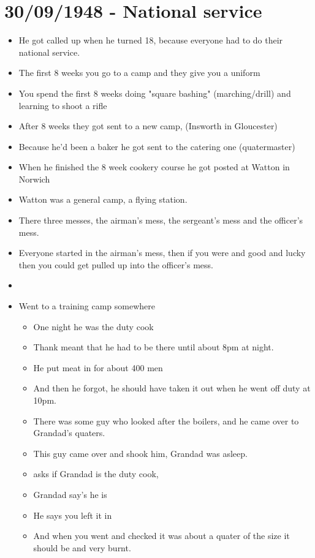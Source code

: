 \documentclass[10pt,twocolumn,letterpaper]{article}
\begin{document}
\section{30/09/1948 - National service}
\begin{itemize}
    \item He got called up when he turned 18, because everyone had to do their national service.
    \item The first 8 weeks you go to a camp and they give you a uniform
    \item You spend the first 8 weeks doing "square bashing" (marching/drill) and learning to shoot a rifle
    \item After 8 weeks they got sent to a new camp, (Insworth in Gloucester)
    \item Because he'd been a baker he got sent to the catering one (quatermaster)
    \item When he finished the 8 week cookery course he got posted at Watton in Norwich
    \item Watton was a general camp, a flying station.
    \item There three messes, the airman's mess, the sergeant's mess and the officer's mess.
    \item Everyone started in the airman's mess, then if you were and good and lucky then you could get pulled up into the officer's mess.
    \item 
    \item Went to a training camp somewhere 
    \begin{itemize}
        \item One night he was the duty cook
        \item Thank meant that he had to be there until about 8pm at night. 
        \item He put meat in for about 400 men
        \item And then he forgot, he should have taken it out when he went off duty at 10pm.
        \item There was some guy who looked after the boilers, and he came over to Grandad's quaters.
        \item This guy came over and shook him, Grandad was asleep.
        \item asks if Grandad is the duty cook,
        \item Grandad say's he is 
        \item He says you left it in 
        \item And when you went and checked it was about a quater of the size it should be and very burnt.

\end{itemize}
\end{itemize}
\end{document}
